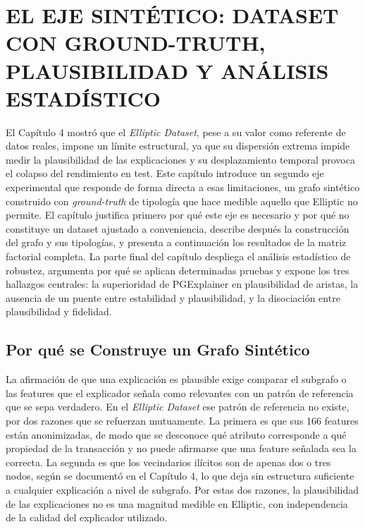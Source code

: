 \chapter{EL EJE SINTÉTICO: DATASET CON GROUND-TRUTH, PLAUSIBILIDAD Y ANÁLISIS ESTADÍSTICO}

El Capítulo 4 mostró que el \textit{Elliptic Dataset}, pese a su valor como referente de datos reales, impone un límite estructural, ya que su dispersión extrema impide medir la plausibilidad de las explicaciones y su desplazamiento temporal provoca el colapso del rendimiento en test. Este capítulo introduce un segundo eje experimental que responde de forma directa a esas limitaciones, un grafo sintético construido con \textit{ground-truth} de tipología que hace medible aquello que Elliptic no permite. El capítulo justifica primero por qué este eje es necesario y por qué no constituye un dataset ajustado a conveniencia, describe después la construcción del grafo y sus tipologías, y presenta a continuación los resultados de la matriz factorial completa. La parte final del capítulo despliega el análisis estadístico de robustez, argumenta por qué se aplican determinadas pruebas y expone los tres hallazgos centrales: la superioridad de PGExplainer en plausibilidad de aristas, la ausencia de un puente entre estabilidad y plausibilidad, y la disociación entre plausibilidad y fidelidad.

\section{Por qué se Construye un Grafo Sintético}

La afirmación de que una explicación es plausible exige comparar el subgrafo o las features que el explicador señala como relevantes con un patrón de referencia que se sepa verdadero. En el \textit{Elliptic Dataset} ese patrón de referencia no existe, por dos razones que se refuerzan mutuamente. La primera es que sus 166 features están anonimizadas, de modo que se desconoce qué atributo corresponde a qué propiedad de la transacción y no puede afirmarse que una feature señalada sea la correcta. La segunda es que los vecindarios ilícitos son de apenas dos o tres nodos, según se documentó en el Capítulo 4, lo que deja sin estructura suficiente a cualquier explicación a nivel de subgrafo. Por estas dos razones, la plausibilidad de las explicaciones no es una magnitud medible en Elliptic, con independencia de la calidad del explicador utilizado.


